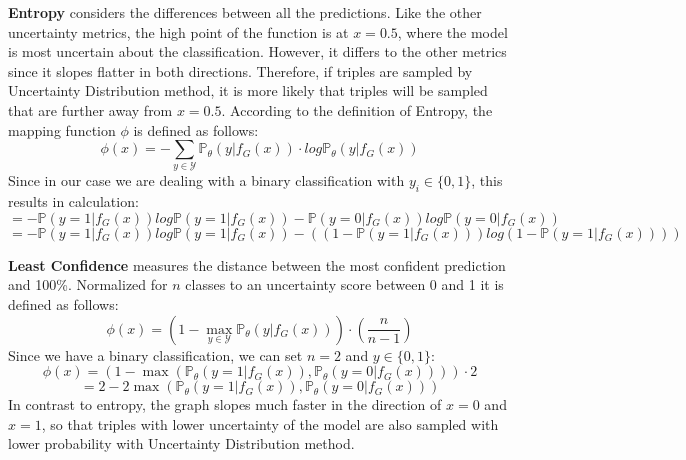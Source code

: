 \textbf{Entropy} considers the differences between all the predictions.
Like the other uncertainty metrics, the high point of the function is at $x = 0.5$, where the model is most uncertain about the classification.
However, it differs to the other metrics since it slopes flatter in both directions.
Therefore, if triples are sampled by Uncertainty Distribution method, it is more likely that triples will be sampled that are further away from $x=0.5$.
According to the definition of Entropy, the mapping function $\phi$ is defined as follows:
\begin{equation}
    \phi(x) = - \sum_{y \in \mathcal{Y}}{\mathds{P}_{\theta}(y | f_G(x)) \cdot log \mathds{P}_{\theta}(y | f_G(x))}
\end{equation}
Since in our case we are dealing with a binary classification with $y_i \in \{0,1\}$, this results in calculation:
\begin{equation}
= - \mathds{P}(y = 1| f_G(x)) log \mathds{P}(y = 1 | f_G(x))
- \mathds{P}(y = 0| f_G(x)) log \mathds{P}(y = 0 | f_G(x))
\end{equation}
\begin{equation}
= - \mathds{P}(y = 1| f_G(x) ) log \mathds{P}(y = 1 | f_G(x))
- ((1 - \mathds{P}(y = 1 | f_G(x)))
     log(1 - \mathds{P}(y = 1 | f_G(x))))
\end{equation}

\textbf{Least Confidence} 
measures the distance between the most confident prediction and 100\%.
Normalized for $n$ classes to an uncertainty score between 0 and 1 it is defined as follows:
\begin{equation}
    \phi(x) = (1 - \max_{y \in \mathcal{Y}}{\mathds{P}_{\theta}(y | f_G(x))}) \cdot \left(\frac{n}{n-1}\right)
\end{equation}
Since we have a binary classification, we can set $n = 2$ and $y \in \{0,1\}$:
\begin{equation}
    \phi(x) = (1 - \max({\mathds{P}_{\theta}(y = 1| f_G(x)), \mathds{P}_{\theta}(y = 0| f_G(x))})) \cdot 2
\end{equation}
\begin{equation} \label{eq:leastconfidence}
    = 2 - 2 \max({\mathds{P}_{\theta}(y = 1| f_G(x)), \mathds{P}_{\theta}(y = 0| f_G(x))})
\end{equation}
In contrast to entropy, the graph slopes much faster in the direction of $x = 0$ and $x = 1$, so that triples with lower uncertainty of the model are also sampled with lower probability with Uncertainty Distribution method.

